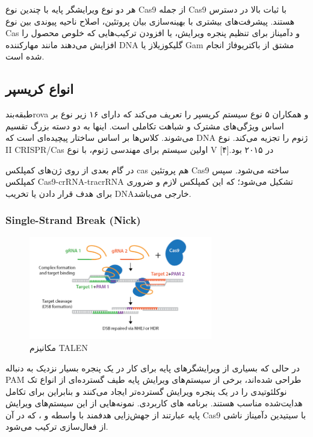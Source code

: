 \documentclass[12pt,a4paper,BCOR=.7cm,headsepline,bibliography=totoc]{report}
\begin{document}
هر دو نوع ویرایشگر پایه با چندین نوع Cas9 از جمله Cas9 با ثبات بالا در دسترس هستند. پیشرفت‌های بیشتری با بهینه‌سازی بیان پروتئین، اصلاح ناحیه پیوندی بین نوع Cas و دآمیناز برای تنظیم پنجره ویرایش، یا افزودن ترکیب‌هایی که خلوص محصول را افزایش می‌دهند مانند مهارکننده DNA گلیکوزیلاز  یا Gam مشتق از باکتریوفاژ  انجام شده است.






\subsection{انواع کریسپر}
طبقه‌بندrova و همکاران ۵ نوع سیستم کریسپر را تعریف می‌کند که دارای ۱۶ زیر نوع بر اساس ویژگی‌های مشترک و شباهت تکاملی است. اینها به دو دسته بزرگ تقسیم می‌شوند. کلاس‌ها بر اساس ساختار پیچیده‌ای است که DNA ژنوم را تجزیه می‌کند. نوع II CRISPR/Cas اولین سیستم برای مهندسی ژنوم، با نوع V در ۲۰۱۵ بود.[۴]

در گام بعدی از روی ژن‌های کمپلکس cas هم پروتئین Cas9 ساخته می‌شود. سپس کمپلکس Cas9-crRNA-tracrRNA تشکیل می‌شود؛ که این کمپلکس لازم و ضروری برای هدف قرار دادن یا تخریب DNAخارجی می‌باشد.

\subsubsection{ Single-Strand Break (Nick)}
\begin{figure}
\centering
\includegraphics[width=8cm, ]{pictures/nick.png}
\caption{
مکانیزم TALEN
}\label{wrap-fig:4}
\end{figure}
در حالی که بسیاری از ویرایشگرهای پایه برای کار در یک پنجره بسیار نزدیک به دنباله PAM طراحی شده‌اند، برخی از سیستم‌های ویرایش پایه طیف گسترده‌ای از انواع تک نوکلئوتیدی  را در یک پنجره ویرایش گسترده‌تر ایجاد می‌کنند و بنابراین برای تکامل هدایت‌شده مناسب هستند. برنامه های کاربردی. نمونه‌هایی از این سیستم‌های ویرایش پایه عبارتند از جهش‌زایی هدفمند با واسطه  و ، که در آن Cas9 با سیتیدین دآمیناز  ناشی از فعال‌سازی ترکیب می‌شود.
\end{document}
